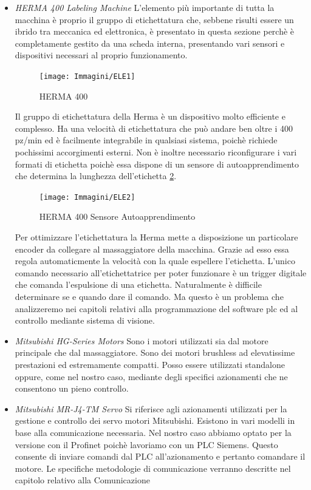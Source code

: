 \documentclass[12pt, a4paper, oneside]{book}
\begin{document}
\begin{itemize}
	
	\item \textit{HERMA 400 Labeling Machine}	
	L'elemento più importante di tutta la macchina è proprio il gruppo di etichettatura che, sebbene risulti essere un ibrido tra meccanica ed elettronica, è presentato in questa sezione perchè è completamente gestito da una scheda interna, presentando vari sensori e dispositivi necessari al proprio funzionamento.
	

	
	\begin{figure}[H]
		\centering
		\texttt{[image: Immagini/ELE1]}
		\label{ele1}
		\caption{HERMA 400}
	\end{figure}
	
	
	Il gruppo di etichettatura della Herma è un dispositivo molto efficiente e complesso. Ha una velocità di etichettatura che può andare ben oltre i 400 pz/min ed è facilmente integrabile in qualsiasi sistema, poichè richiede pochissimi accorgimenti esterni. Non è inoltre necessario riconfigurare i vari formati di etichetta poichè essa dispone di un sensore di autoapprendimento che determina la lunghezza dell'etichetta \ref{ele2}.
	
		\begin{figure}[H]
		\centering
		\texttt{[image: Immagini/ELE2]}
		\label{ele2}
		\caption{HERMA 400 Sensore Autoapprendimento}
	\end{figure}
	
	 Per ottimizzare l'etichettatura la Herma mette a disposizione un particolare encoder da collegare al massaggiatore della macchina. Grazie ad esso essa regola automaticmente la velocità con la quale espellere l'etichetta. L'unico comando necessario all'etichettatrice per poter funzionare è un trigger digitale che comanda l'espulsione di una etichetta. Naturalmente è difficile determinare se e quando dare il comando. Ma questo è un problema che analizzeremo nei capitoli relativi alla programmazione del software plc ed al controllo mediante sistema di visione.  
	
	\item \textit{Mitsubishi HG-Series Motors}
	Sono i motori utilizzati sia dal motore principale che dal massaggiatore. Sono dei motori brushless ad elevatissime prestazioni ed estremamente compatti. Posso essere utilizzati standalone oppure, come nel nostro caso, mediante degli specifici azionamenti che ne consentono un pieno controllo. 
	
	\item \textit{Mitsubishi MR-J4-TM Servo}
	Si riferisce agli azionamenti utilizzati per la gestione e controllo dei servo motori Mitsubishi. Esistono in vari modelli in base alla comunicazione necessaria. Nel nostro caso abbiamo optato per la versione con il Profinet poichè lavoriamo con un PLC Siemens. Questo consente di inviare comandi dal PLC all'azionamento e pertanto comandare il motore. Le specifiche metodologie di comunicazione verranno descritte nel capitolo relativo alla Comunicazione
	

\end{itemize}
\end{document}
